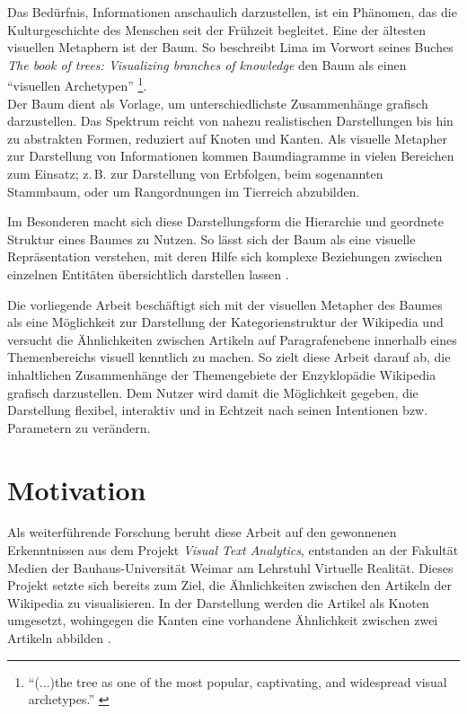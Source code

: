 
Das Bedürfnis, Informationen anschaulich darzustellen, ist ein Phänomen, das die Kulturgeschichte des Menschen seit der Frühzeit begleitet.
Eine der ältesten visuellen Metaphern ist der Baum.
So beschreibt Lima im Vorwort seines Buches \emph{The book of trees: Visualizing branches of knowledge} den Baum als einen "`visuellen Archetypen"' \footnote{ "`(...)the tree as one of the most popular, captivating, and widespread visual archetypes."' \cite[S. 9]{lima2014book}}. \\
Der Baum dient als Vorlage, um unterschiedlichste Zusammenhänge grafisch darzustellen.
Das Spektrum reicht von nahezu realistischen Darstellungen bis hin zu abstrakten Formen, reduziert auf Knoten und Kanten.
Als visuelle Metapher zur Darstellung von Informationen kommen Baumdiagramme in vielen Bereichen zum Einsatz; z.\,B. zur Darstellung von Erbfolgen, beim sogenannten Stammbaum, oder um Rangordnungen im Tierreich abzubilden. \cite{lima2014book}

Im Besonderen macht sich diese Darstellungsform die Hierarchie und geordnete Struktur eines Baumes zu Nutzen.
So lässt sich der Baum als eine visuelle Repräsentation verstehen, mit deren Hilfe sich komplexe Beziehungen zwischen einzelnen Entitäten übersichtlich darstellen lassen \cite[S. 43]{lima2014book}.

Die vorliegende Arbeit beschäftigt sich mit der visuellen Metapher des Baumes als eine Möglichkeit zur Darstellung der Kategorienstruktur der Wikipedia und versucht die Ähnlichkeiten zwischen Artikeln auf Paragrafenebene innerhalb eines Themenbereichs visuell kenntlich zu machen.
So zielt diese Arbeit darauf ab, die inhaltlichen Zusammenhänge der Themengebiete der Enzyklopädie Wikipedia grafisch darzustellen.
Dem Nutzer wird damit die Möglichkeit gegeben, die Darstellung flexibel, interaktiv und in Echtzeit nach seinen Intentionen bzw. Parametern zu verändern.

\section{Motivation}\label{subchap:motivation}
Als weiterführende Forschung beruht diese Arbeit auf den gewonnenen Erkenntnissen aus dem Projekt \emph{Visual Text Analytics}, entstanden an der Fakultät Medien der Bauhaus-Universität Weimar am Lehrstuhl Virtuelle Realität.
Dieses Projekt setzte sich bereits zum Ziel, die Ähnlichkeiten zwischen den Artikeln der Wikipedia zu visualisieren.
In der Darstellung werden die Artikel als Knoten umgesetzt, wohingegen die Kanten eine vorhandene Ähnlichkeit zwischen zwei Artikeln abbilden \cite{riehmann2016visualizing}.

